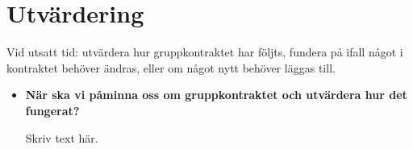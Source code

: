 \documentclass{mall}
\begin{document}
\section{Utvärdering}


Vid utsatt tid: utvärdera hur gruppkontraktet har följts, fundera på ifall något i kontraktet
behöver ändras, eller om något nytt behöver läggas till.

\begin{itemize}
\item \textbf{När ska vi påminna oss om gruppkontraktet och utvärdera hur det fungerat?}

  Skriv text här.

\end{itemize}
\end{document}
